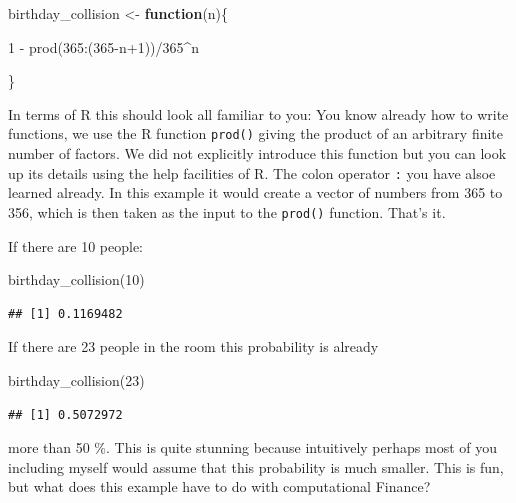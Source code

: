 \documentclass[
]{book}
\newenvironment{Shaded}{\begin{snugshade}}{\end{snugshade}}
\newcommand{\ControlFlowTok}[1]{\textcolor[rgb]{0.13,0.29,0.53}{\textbf{#1}}}
\newcommand{\DecValTok}[1]{\textcolor[rgb]{0.00,0.00,0.81}{#1}}
\newcommand{\FunctionTok}[1]{\textcolor[rgb]{0.00,0.00,0.00}{#1}}
\newcommand{\NormalTok}[1]{#1}
\newcommand{\OtherTok}[1]{\textcolor[rgb]{0.56,0.35,0.01}{#1}}
\newcommand{\SpecialCharTok}[1]{\textcolor[rgb]{0.00,0.00,0.00}{#1}}
\begin{document}
\begin{Shaded}
\begin{Highlighting}[]
\NormalTok{birthday\_collision }\OtherTok{\textless{}{-}} \ControlFlowTok{function}\NormalTok{(n)\{}
  
  \DecValTok{1} \SpecialCharTok{{-}} \FunctionTok{prod}\NormalTok{(}\DecValTok{365}\SpecialCharTok{:}\NormalTok{(}\DecValTok{365}\SpecialCharTok{{-}}\NormalTok{n}\SpecialCharTok{+}\DecValTok{1}\NormalTok{))}\SpecialCharTok{/}\DecValTok{365}\SpecialCharTok{\^{}}\NormalTok{n}
  
\NormalTok{\}}
\end{Highlighting}
\end{Shaded}

In terms of R this should look all familiar to you: You know already how to write functions, we
use the R function \texttt{prod()} giving the product of an arbitrary finite number of factors. We did
not explicitly introduce this function but you can look up its details using the help facilities of R. The colon operator \texttt{:} you have alsoe learned already. In this example it would create
a vector of numbers from 365 to 356, which is then taken as the input to the \texttt{prod()} function. That's it.

If there are 10 people:

\begin{Shaded}
\begin{Highlighting}[]
\FunctionTok{birthday\_collision}\NormalTok{(}\DecValTok{10}\NormalTok{)}
\end{Highlighting}
\end{Shaded}

\begin{verbatim}
## [1] 0.1169482
\end{verbatim}

If there are 23 people in the room this probability is already

\begin{Shaded}
\begin{Highlighting}[]
\FunctionTok{birthday\_collision}\NormalTok{(}\DecValTok{23}\NormalTok{)}
\end{Highlighting}
\end{Shaded}

\begin{verbatim}
## [1] 0.5072972
\end{verbatim}

more than 50 \%. This is quite stunning because intuitively perhaps most of you
including myself would assume that this probability is much smaller. This is fun, but
what does this example have to do with computational Finance?
\end{document}
